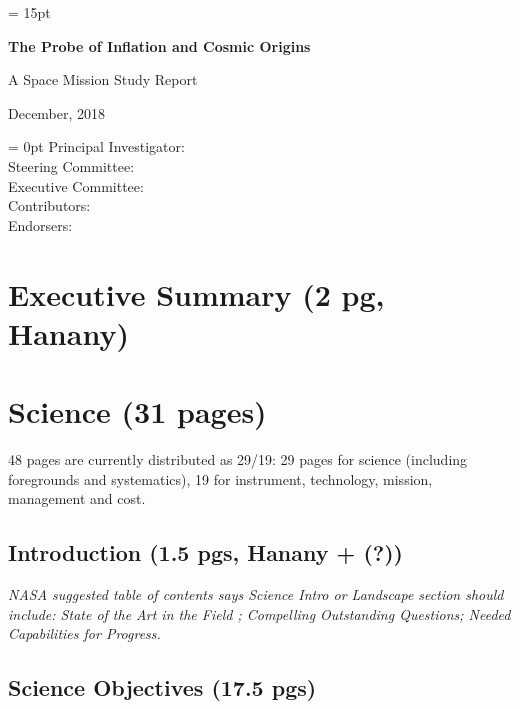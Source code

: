 \documentclass[12pt]{article}
\begin{document}


\setlength{\baselineskip}{0.96\baselineskip} %
\setlength{\parskip}{1.\parskip}

\parindent = 15pt


\setcounter{page}{0}
\setcounter{figure}{0}

\LARGE{ \centerline{\bf{The Probe of Inflation and Cosmic Origins}}}
\vspace{0.5in}
\Large{ \centerline{A Space Mission Study Report}}
\Large{ \centerline{December, 2018 }}
\vspace{0.5in}
\parindent = 0pt
\large{Principal Investigator:} \\
\large{Steering Committee:} \\
\large{Executive Committee:} \\
\large{Contributors:} \\
\large{Endorsers:} \\

\normalsize

\newpage

%


\section{Executive Summary (2 pg, Hanany)} 


\section{Science (31 pages)}

48 pages are currently distributed as 29/19: 29 pages for science (including foregrounds and systematics), 19 for instrument, technology, mission, management and cost.

    \subsection{Introduction (1.5 pgs, Hanany + (?))}

{\it NASA suggested table of contents says Science Intro or Landscape section should include: State of the Art in the Field ; 
Compelling Outstanding Questions; Needed Capabilities for Progress. }




\subsection{Science Objectives (17.5 pgs) } 
\end{document}
